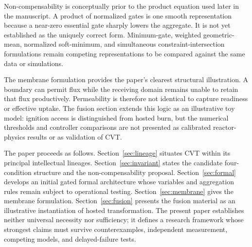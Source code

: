 Non-compensability is conceptually prior to the product equation used later in the manuscript. A product of normalized gates is one smooth representation because a near-zero essential gate sharply lowers the aggregate. It is not yet established as the uniquely correct form. Minimum-gate, weighted geometric-mean, normalized soft-minimum, and simultaneous constraint-intersection formulations remain competing representations to be compared against the same data or simulations.

The membrane formulation provides the paper's clearest structural illustration. A boundary can permit flux while the receiving domain remains unable to retain that flux productively. Permeability is therefore not identical to capture readiness or effective uptake. The fusion section extends this logic as an illustrative toy model: ignition access is distinguished from hosted burn, but the numerical thresholds and controller comparisons are not presented as calibrated reactor-physics results or as validation of CVT.

The paper proceeds as follows. Section~\ref{sec:lineage} situates CVT within its principal intellectual lineages. Section~\ref{sec:invariant} states the candidate four-condition structure and the non-compensability proposal. Section~\ref{sec:formal} develops an initial gated formal architecture whose variables and aggregation rules remain subject to operational testing. Section~\ref{sec:membrane} gives the membrane formulation. Section~\ref{sec:fusion} presents the fusion material as an illustrative instantiation of hosted transformation. The present paper establishes neither universal necessity nor sufficiency; it defines a research framework whose strongest claims must survive counterexamples, independent measurement, competing models, and delayed-failure tests.

